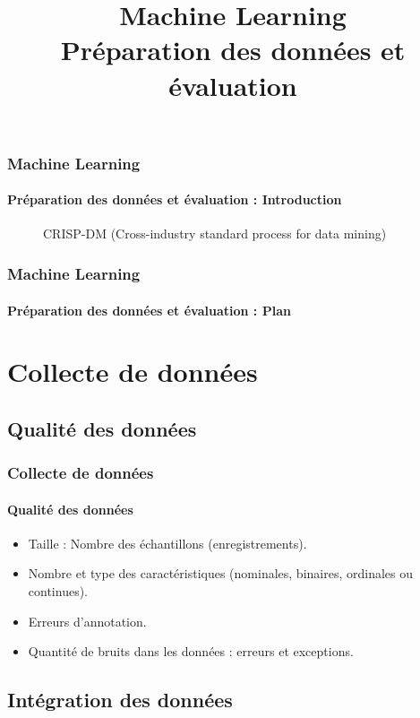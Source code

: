 \documentclass[xcolor=table]{beamer}
\title[ML : Préparation des données et évaluation] %
{Machine Learning \\Préparation des données et évaluation}
\begin{document}
	
\begin{frame}
	\frametitle{Machine Learning}
	\framesubtitle{Préparation des données et évaluation : Introduction}
	
	\begin{figure}
		\centering
		\caption{CRISP-DM (Cross-industry standard process for data mining)}
	\end{figure}
	
\end{frame}


\begin{frame}
	\frametitle{Machine Learning}
	\framesubtitle{Préparation des données et évaluation : Plan}
	
	\begin{multicols}{2}
		\tableofcontents
	\end{multicols}
\end{frame}

\section{Collecte de données}

\subsection{Qualité des données}

\begin{frame}
\frametitle{Collecte de données}
\framesubtitle{Qualité des données}

\begin{itemize}
	\item Taille : Nombre des échantillons (enregistrements).
	\item Nombre et type des caractéristiques (nominales, binaires, ordinales ou continues).
	\item Erreurs d'annotation.
	\item Quantité de bruits dans les données : erreurs et exceptions.
\end{itemize}

\end{frame}


\subsection{Intégration des données}
\end{document}
